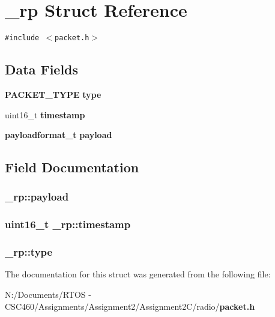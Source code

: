 \section{\_\-rp Struct Reference}
\label{struct__rp}
{\tt \#include $<$packet.h$>$}

\subsection*{Data Fields}
\begin{CompactItemize}
\item 
{\bf PACKET\_\-TYPE} {\bf type}
\item 
uint16\_\-t {\bf timestamp}
\item 
{\bf payloadformat\_\-t} {\bf payload}
\end{CompactItemize}


\subsection{Field Documentation}
\subsubsection{ {\bf \_\-rp::payload}}\label{struct__rp_8df0eef8b32918b04fd57e68c9399d89}


\subsubsection{\setlength{\rightskip}{0pt plus 5cm}uint16\_\-t {\bf \_\-rp::timestamp}}\label{struct__rp_1e8e778166b5da2b4d91832c494d1bf8}


\subsubsection{ {\bf \_\-rp::type}}\label{struct__rp_d05b10f44627878c1d5ffa3ac3aea973}




The documentation for this struct was generated from the following file:\begin{CompactItemize}
\item 
N:/Documents/RTOS - CSC460/Assignments/Assignment2/Assignment2C/radio/{\bf packet.h}\end{CompactItemize}
